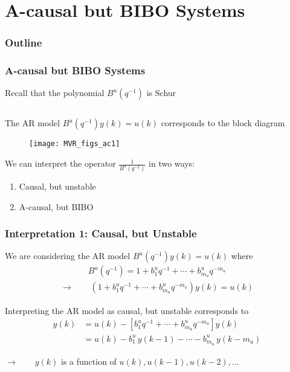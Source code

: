 \section{A-causal but BIBO Systems}
\begin{frame}
    \frametitle{Outline}
    \tableofcontents[currentsection]
\end{frame}

\begin{frame}
    \frametitle{A-causal but BIBO Systems}

    Recall that the polynomial $B^u(q^{-1})$ is Schur
    \pause

    $\,$

    The AR model $B^u(q^{-1}) y(k) = u(k)$ corresponds to the block diagram
    \begin{figure}
        \texttt{[image: MVR\_figs\_ac1]}
    \end{figure}
    \pause


    We can interpret the operator $\displaystyle{ \frac{1}{B^u(q^{-1})} }$ in two ways:
    \pause
    \begin{enumerate}
        \item
        Causal, but unstable
        \pause

        \item
        A-causal, but BIBO
    \end{enumerate}
\end{frame}

\begin{frame}
    \frametitle{Interpretation 1: Causal, but Unstable}

    We are considering the AR model $B^u(q^{-1}) y(k) = u(k)$ where
    \begin{align*}
        B^u(q^{-1}) = 1 + b_1^u q^{-1} + \cdots + b_{m_u}^u q^{-m_u}
    \end{align*}
    \paused
    \begin{align*}
        \longrightarrow \qquad (1 + b_1^u q^{-1} + \cdots + b_{m_u}^u q^{-m_u}) y(k) = u(k)
    \end{align*}
    \pause

    Interpreting the AR model as causal, but unstable corresponds to
    \begin{align*}
        y(k) & = u(k) - [b_1^u q^{-1} + \cdots + b_{m_u}^u q^{-m_u}] y(k) \\
        & = u(k) - b_1^u \, y(k-1) - \cdots - b_{m_u}^u \, y(k-m_u)
    \end{align*}
    \paused

    $\longrightarrow \qquad y(k)$ is a function of $u(k),u(k-1),u(k-2),\ldots$
\end{frame}

